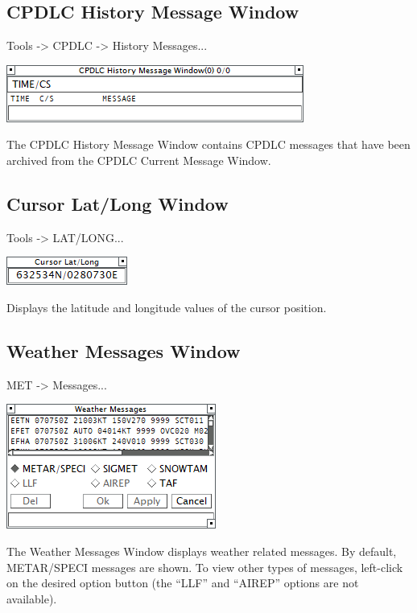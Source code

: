\documentclass[11pt,a4paper]{memoir}
\begin{document}
\subsection{CPDLC History Message Window}
\label{win:dlhmw}

\textit{} Tools -> CPDLC -> History Messages...

\includegraphics{img/dlhmw.png}

The CPDLC History Message Window contains CPDLC messages that have been archived from the CPDLC
Current Message Window.

\subsection{Cursor Lat/Long Window}
\label{win:latlon}

\textit{} Tools -> LAT/LONG...

\includegraphics{img/latlon.png}

Displays the latitude and longitude values of the cursor position.

\subsection{Weather Messages Window}
\label{win:wxmw}

\textit{} MET -> Messages...

\includegraphics{img/wxmsg.png}

The Weather Messages Window displays weather related messages. By default, METAR/SPECI messages are shown. To view other types of messages, left-click on the desired option button (the “LLF” and “AIREP” options are not available).
\end{document}
